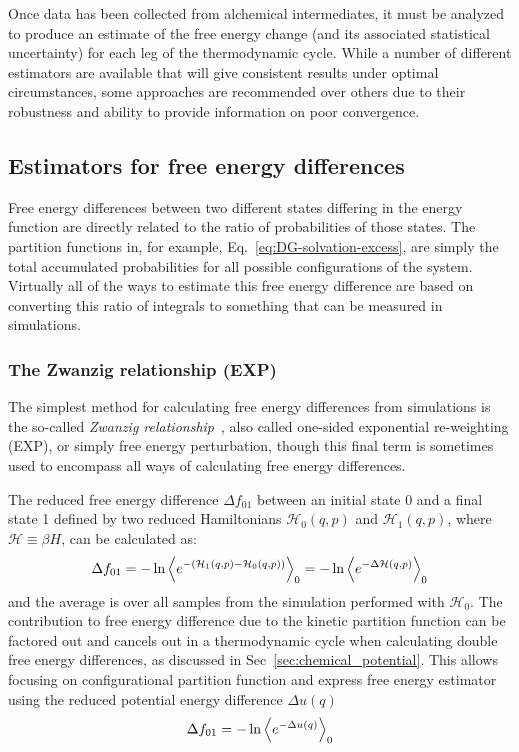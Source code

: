 Once data has been collected from alchemical intermediates, it must be analyzed to produce an estimate of the free energy change (and its associated statistical uncertainty) for each leg of the thermodynamic cycle.
While a number of different estimators are available that will give consistent results under optimal circumstances, some approaches are recommended over others due to their robustness and ability to provide information on poor convergence.

\subsection{Estimators for free energy differences}
\label{subsec:estimators}
Free energy differences between two different states differing in the energy function are directly related to the
ratio of probabilities of those states.
The partition functions in, for example, Eq.~\ref{eq:DG-solvation-excess}, are simply the total accumulated probabilities for all possible configurations of the system. Virtually all of the ways to estimate this free energy difference are based on converting this ratio of integrals to something that can be measured in simulations.  

\subsubsection{The Zwanzig relationship (EXP)}
The simplest method for calculating free energy differences from simulations is the so-called \textit{Zwanzig
relationship}~\cite{zwanzig1954hightemperature}, also called one-sided exponential re-weighting (EXP), or simply free energy perturbation, though this final term is sometimes used to encompass all ways of calculating free energy differences.

The reduced free energy difference $\Delta f_{01}$ between an initial state 0 and a final state 1 defined by two reduced Hamiltonians $\mathcal{H}_0(q,p)$ and $\mathcal{H}_1(q,p)$, where $\mathcal{H} \equiv \beta H$, can be calculated as:
\begin{eqnarray}
\Delta f_{01}  =  -\ln \left\langle{e^{- (\mathcal{H}_1(q,p) - \mathcal{H}_0(q,p))}}\right\rangle_0 =  -\ln \left\langle{e^{- \Delta \mathcal{H}(q,p)} }\right\rangle_0
\end{eqnarray}
and the average is over all samples from the simulation performed with $\mathcal{H}_0$.
The contribution to free energy difference due to the kinetic partition function can be factored out and cancels out in a thermodynamic cycle when calculating double free energy differences, as discussed in Sec~\ref{sec:chemical_potential}.
This allows focusing on configurational partition function and express free energy estimator using the reduced potential energy difference $\Delta u(q)$
\begin{eqnarray}\label{eqn.zwanzig_configurational}
\Delta f_{01}  =   -\ln \left\langle{e^{- \Delta u(q)} }\right\rangle_0
\end{eqnarray}

